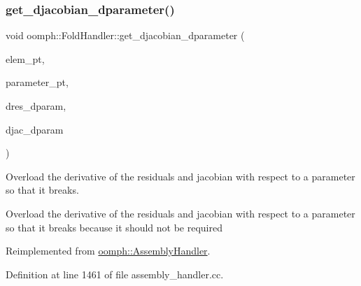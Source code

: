 \mbox{\label{classoomph_1_1FoldHandler_a674cf9fe7c065e54c95813c2baeea84c}} 
\subsubsection{\texorpdfstring{get\+\_\+djacobian\+\_\+dparameter()}{get\_djacobian\_dparameter()}}
{\footnotesize\ttfamily void oomph\+::\+Fold\+Handler\+::get\+\_\+djacobian\+\_\+dparameter (\begin{DoxyParamCaption}\item[{\hyperlink{classoomph_1_1GeneralisedElement}{Generalised\+Element} $\ast$const \&}]{elem\+\_\+pt,  }\item[{double $\ast$const \&}]{parameter\+\_\+pt,  }\item[{\hyperlink{classoomph_1_1Vector}{Vector}$<$ double $>$ \&}]{dres\+\_\+dparam,  }\item[{\hyperlink{classoomph_1_1DenseMatrix}{Dense\+Matrix}$<$ double $>$ \&}]{djac\+\_\+dparam }\end{DoxyParamCaption})\hspace{0.3cm}{\ttfamily [virtual]}}



Overload the derivative of the residuals and jacobian with respect to a parameter so that it breaks. 

Overload the derivative of the residuals and jacobian with respect to a parameter so that it breaks because it should not be required 

Reimplemented from \hyperlink{classoomph_1_1AssemblyHandler_aefc0c13a65342806c167c5d53f014803}{oomph\+::\+Assembly\+Handler}.



Definition at line 1461 of file assembly\+\_\+handler.\+cc.

\mbox{\label{classoomph_1_1FoldHandler_ad98b98488b683fa3ad9497b662e6e5b6}} 
